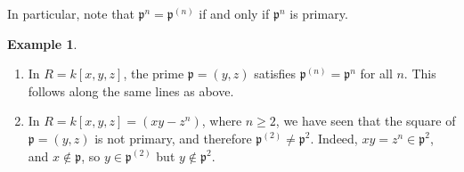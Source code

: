 \documentclass{amsart}[12pt]
\newcommand{\p}{{\mathfrak p}}
\numberwithin{equation}{section}
\theoremstyle{plain} %
\theoremstyle{definition}
\newtheorem{example}[equation]{Example}
\theoremstyle{remark}
\begin{document}
In particular, note that $\p^n = \p^{(n)}$ if and only if $\p^n$ is primary.

\begin{example}$\,$
	\begin{enumerate}
		\item In $R=k[x,y,z]$, the prime $\p=(y,z)$ satisfies $\p^{(n)}=\p^n$ for all $n$. This follows along the same lines as above.
		\item In $R=k[x,y,z]=(xy-z^n)$, where $n \geqslant 2$, we have seen that the square of $\p=(y,z)$ is not primary, and therefore $\p^{(2)}\neq \p^2$. Indeed, $xy=z^n \in \p^2$, and $x\notin \p$, so $y\in \p^{(2)}$ but $y \notin \p^2$.
	\end{enumerate}
\end{example}
\end{document}
